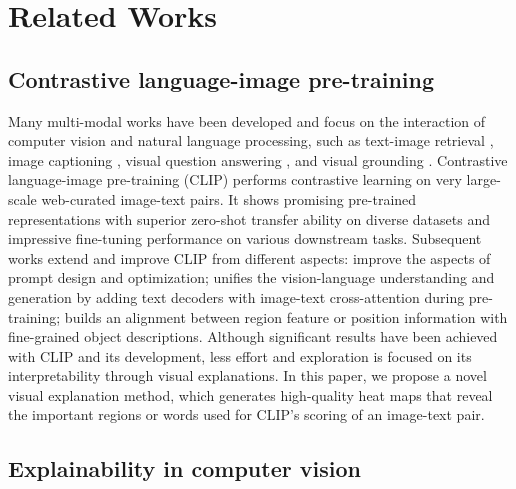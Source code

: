 \section{Related Works}
\label{sec:related}
\vspace{-0.1cm}



\vspace{-0.1cm}
\subsection{Contrastive language-image pre-training}

Many multi-modal works have been developed and focus on the interaction of computer vision and natural language processing, such as text-image retrieval \cite{wang2019camp}, image captioning \cite{xu2015show}, visual question answering \cite{antol2015vqa}, and visual grounding \cite{plummer2015flickr30k}.
Contrastive language-image pre-training (CLIP) performs contrastive learning on very large-scale web-curated image-text pairs. It shows  promising pre-trained representations with superior zero-shot transfer ability on diverse datasets and impressive fine-tuning performance on various downstream tasks. 
Subsequent works extend and improve CLIP from different aspects: \citep{zhou2022learning,chen2022prompt} improve the aspects of prompt design and optimization; \citep{yu2022coca,li2022blip} unifies the vision-language understanding and generation by adding text decoders with image-text cross-attention during pre-training; \citep{li2020oscar,wang2023position,zhong2022regionclip,wu2023clipself} builds an alignment between region feature or position information with fine-grained object descriptions. 
Although significant results have been achieved with CLIP and its development, less effort and exploration is focused on its interpretability through visual explanations. In this paper, we propose a novel visual explanation method, which generates high-quality heat maps that reveal the important regions or words used for CLIP's scoring of an image-text pair. 

\vspace{-0.1cm}
\subsection{Explainability in computer vision}

